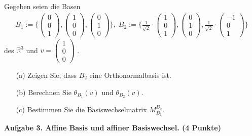 \documentclass[a4paper,12pt]{scrartcl}
\begin{document}
Gegeben seien die Basen 
\begin{align*}
B_1 := \Biggl \{  
\begin{pmatrix} 0 \\  0 \\ 1 \end{pmatrix},
\begin{pmatrix} 1\\  0 \\  0  \end{pmatrix},
\begin{pmatrix} 0 \\ 1 \\  0  \end{pmatrix}
  \Biggr \}
, \;
B_2 := \Biggl \{  
 \frac{1}{\sqrt{2}} \cdot \begin{pmatrix} 1 \\  0 \\ 1 \end{pmatrix},
\begin{pmatrix} 0\\  1 \\  0  \end{pmatrix},
\frac{1}{\sqrt{2}} \cdot \begin{pmatrix} -1 \\ 0  \\  1  \end{pmatrix}
  \Biggr \} 
\end{align*}
des $\mathbb{R}^3$ und $v =\begin {pmatrix} 1 \\  0 \\ 0 \end{pmatrix}$ .
\begin{itemize}\itemsep0pt
\item[(a)] Zeigen Sie, dass $B_2$ eine Orthonormalbasis ist.
\item[(b)]  Berechnen Sie  $\theta_{B_1} (v)$ und  $\theta_{B_2}(v)$.
\item[(c)] Bestimmen Sie die Basiswechselmatrix $M_{B_1}^{B_2}$.
\end{itemize}


 
\vspace*{4mm}

{\bf Aufgabe 3. Affine Basis und affiner Basiswechsel. \hfill (4 Punkte)}
\end{document}
